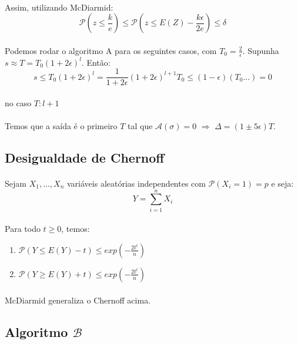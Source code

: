 \paragraph{} Assim, utilizando McDiarmid:
$$\mathcal{P}(z \leq \frac{k}{e}) \leq \mathcal{P}(z \leq E(Z) - \frac{k\epsilon}{2e}) \leq \delta$$

\paragraph{} Podemos rodar o algoritmo A para os seguintes casos, com
$T_0=\frac{2}{\epsilon}$. Supunha $s \approx T=T_0(1+2\epsilon)^l$. Então:
$$s \leq T_0(1+2\epsilon)^l=\frac{1}{1+2\epsilon}(1+2\epsilon)^{l+1}T_0\leq (1-\epsilon)(T_0 ...)=0$$
\paragraph{}no caso $T:l+1$

\paragraph{} Temos que a saída é o primeiro $T$ tal que $\mathcal{A}(\sigma)=0$ $\Rightarrow$ $\Delta=(1 \pm 5\epsilon)T$. 

\subsection{Desigualdade de Chernoff}
\paragraph{} Sejam $X_1,...,X_n$ variáveis aleatórias independentes com $\mathcal{P}(X_i = 1) = p$ e seja:
$$Y = \sum_{i=1}^n X_i$$ 
\paragraph{} Para todo $t\geq 0$, temos:
\begin{enumerate}
    \centering
    \item $\mathcal{P}(Y \leq E(Y)-t) \leq exp(-\frac{2t^t}{n})$
    \item $\mathcal{P}(Y \geq E(Y)+t) \leq exp(-\frac{2t^t}{n})$
\end{enumerate}
\paragraph{} McDiarmid generaliza o Chernoff acima.

\subsection{Algoritmo $\mathcal{B}$}
